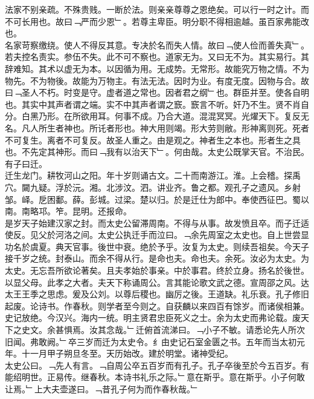 \documentclass{zhvt-classic}
\begin{document}
\hspace*{2em}法家不别亲疏。不殊贵贱。一断於法。则亲亲尊尊之恩绝矣。可以行一时之计。而不可长用也。故曰﹁严而少恩﹂。若尊主卑臣。明分职不得相逾越。虽百家弗能改也。\\
\hspace*{2em}名家苛察缴绕。使人不得反其意。专决於名而失人情。故曰﹁使人俭而善失真﹂。若夫控名责实。参伍不失。此不可不察也。道家无为。又曰无不为。其实易行。其辞难知。其术以虚无为本。以因循为用。无成势。无常形。故能究万物之情。不为物先。不为物後。故能为万物主。有法无法。因时为业。有度无度。因物与合。故曰﹁圣人不朽。时变是守。虚者道之常也。因者君之纲﹂也。群臣并至。使各自明也。其实中其声者谓之端。实不中其声者谓之窾。窾言不听。奸乃不生。贤不肖自分。白黑乃形。在所欲用耳。何事不成。乃合大道。混混冥冥。光燿天下。复反无名。凡人所生者神也。所讬者形也。神大用则竭。形大劳则敝。形神离则死。死者不可复生。离者不可复反。故圣人重之。由是观之。神者生之本也。形者生之具也。不先定其神形。而曰﹁我有以治天下﹂。何由哉。太史公既掌天官。不治民。有子曰迁。\\
\hspace*{2em}迁生龙门。耕牧河山之阳。年十岁则诵古文。二十而南游江。淮。上会稽。探禹穴。闚九疑。浮於沅。湘。北涉汶。泗。讲业齐。鲁之都。观孔子之遗风。乡射邹。峄。戹困鄱。薛。彭城。过梁。楚以归。於是迁仕为郎中。奉使西征巴。蜀以南。南略邛。笮。昆明。还报命。\\
\hspace*{2em}是岁天子始建汉家之封。而太史公留滞周南。不得与从事。故发愤且卒。而子迁适使反。见父於河洛之间。太史公执迁手而泣曰。﹁余先周室之太史也。自上世尝显功名於虞夏。典天官事。後世中衰。绝於予乎。汝复为太史。则续吾祖矣。今天子接千岁之统。封泰山。而余不得从行。是命也夫。命也夫。余死。汝必为太史。为太史。无忘吾所欲论著矣。且夫孝始於事亲。中於事君。终於立身。扬名於後世。以显父母。此孝之大者。夫天下称诵周公。言其能论歌文武之德。宣周邵之风。达太王王季之思虑。爰及公刘。以尊后稷也。幽厉之後。王道缺。礼乐衰。孔子修旧起废。论诗书。作春秋。则学者至今则之。自获麟以来四百有馀岁。而诸侯相兼。史记放绝。今汉兴。海内一统。明主贤君忠臣死义之士。余为太史而弗论载。废天下之史文。余甚惧焉。汝其念哉。﹂迁俯首流涕曰。﹁小子不敏。请悉论先人所次旧闻。弗敢阙。﹂卒三岁而迁为太史令。纟由史记石室金匮之书。五年而当太初元年。十一月甲子朔旦冬至。天历始改。建於明堂。诸神受纪。\\
\hspace*{2em}太史公曰。﹁先人有言。﹁自周公卒五百岁而有孔子。孔子卒後至於今五百岁。有能绍明世。正易传。继春秋。本诗书礼乐之际。﹂意在斯乎。意在斯乎。小子何敢让焉。﹂上大夫壶遂曰。﹁昔孔子何为而作春秋哉。﹂\\
\end{document}
